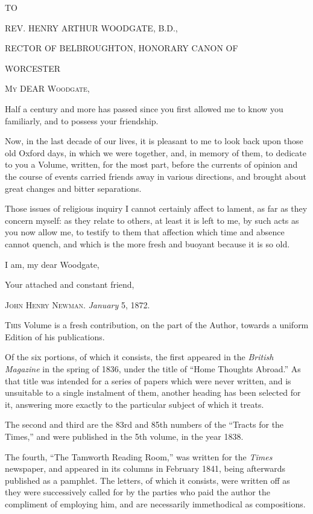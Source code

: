 





TO

REV. HENRY ARTHUR WOODGATE, B.D.,

RECTOR OF BELBROUGHTON, HONORARY CANON OF

WORCESTER


M\textsc{y} DEAR W\textsc{oodgate},

Half a century and more has passed since you first allowed me to know
you familiarly, and to possess your friendship.


Now, in the last decade of our lives, it is pleasant to me to look
back upon those old Oxford days, in which we were together, and, in
memory of them, to dedicate to you a Volume, written, for the most
part, before the currents of opinion and the course of events carried
friends away in various directions, and brought about great changes
and bitter separations.


Those issues of religious inquiry I cannot certainly affect to
lament, as far as they concern myself: as they relate to others, at
least it is left to me, by such acts as you now allow me, to testify
to them that affection which time and absence cannot quench, and which
is the more fresh and buoyant because it is so old.


I am, my dear Woodgate,

Your attached and constant friend,

J\textsc{ohn} H\textsc{enry} N\textsc{ewman}.
\emph{January} 5, 1872.








T\textsc{his} Volume is a fresh contribution, on the part of the Author,
towards a uniform Edition of his publications.


Of the six portions, of which it consists, the first appeared in
the \emph{British Magazine} in the spring of 1836, under the title of
``Home Thoughts Abroad.'' As that title was intended for a
series of papers which were never written, and is unsuitable to a
single instalment of them, another heading has been selected for it,
answering more exactly to the particular subject of which it treats.


The second and third are the 83rd and 85th numbers of the
``Tracts for the Times,'' and were published in the 5th
volume, in the year 1838.


The fourth, ``The Tamworth Reading Room,'' was written for
the \emph{Times} newspaper, and appeared in its columns in February
1841, being afterwards published as a pamphlet. The letters, of which
it consists, were written off as they were successively called for by
the parties who paid the author the compliment of employing him, and
are necessarily immethodical as compositions.

